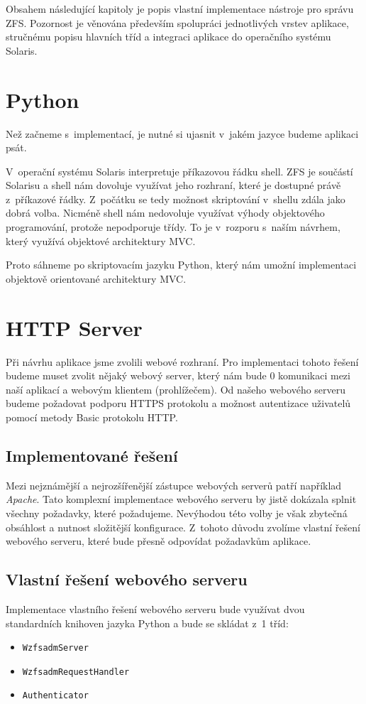 Obsahem následující kapitoly je popis vla\-stní implementace nástroje pro sprá\-vu ZFS. Pozornost je věnována především spolupráci jednotlivých vrstev aplikace, stručnému popisu hlavních tříd a integraci aplikace do operačního systému Solaris.
\section{Python}
Než začneme s~implementací, je nutné si ujasnit v~jakém jazyce budeme aplikaci psát.

V~operační systému Solaris interpretuje příkazovou řádku shell. ZFS je součástí Solarisu a shell nám dovoluje využívat jeho rozhraní, které je dostupné právě z~příkazové řádky. Z~počátku se tedy možnost skriptování v~shellu zdála jako dobrá volba. Nicméně shell nám nedovoluje využívat výhody objektového programování, protože nepodporuje třídy. To je v~rozporu s~naším návrhem, který využívá objektové architektury MVC.

Proto sáhneme po skriptovacím jazyku Python, který nám umožní implementaci objektově orientované architektury MVC.
\section{HTTP Server}
Při návrhu aplikace jsme zvolili webové rozhraní. Pro implementaci tohoto řešení budeme muset zvolit nějaký webový server, který nám bude 0 komunikaci mezi naší aplikací a webovým klientem (prohlížečem). Od našeho webového serveru budeme požadovat podporu HTTPS protokolu a možnost autentizace uživatelů pomocí metody Basic protokolu HTTP.
    \subsection{Implementované řešení}
    Mezi nejznámější a nejrozšířenější zástupce webových serverů patří například \emph{Apache}. Tato komplexní implementace webového serveru by jistě dokázala splnit všechny požadavky, které požadujeme. Nevýhodou této volby je však zbytečná obsáhlost a nutnost složitější konfigurace. Z~tohoto důvodu zvolíme vlastní řešení webového serveru, které bude přesně odpovídat požadavkům aplikace.
    \subsection{Vlastní řešení webového serveru}
    Implementace vlastního řešení webového serveru bude využívat dvou standardních knihoven jazyka Python a bude se skládat z~1 tříd:
    \begin{itemize}
      \item \verb|WzfsadmServer|
      \item \verb|WzfsadmRequestHandler|
      \item \verb|Authenticator|
    \end{itemize}

